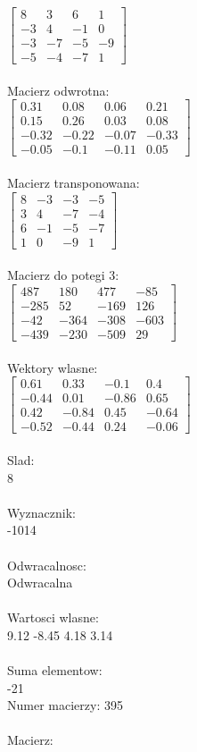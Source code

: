 \documentclass[a4paper,12pt]{article}
\begin{document}
$\begin{bmatrix} 8&3&6&1\\-3&4&-1&0\\-3&-7&-5&-9\\-5&-4&-7&1 \end{bmatrix}$
\\
\\
Macierz odwrotna:\\

$\begin{bmatrix} 0.31&0.08&0.06&0.21\\0.15&0.26&0.03&0.08\\-0.32&-0.22&-0.07&-0.33\\-0.05&-0.1&-0.11&0.05 \end{bmatrix}$
\\
\\
Macierz transponowana:\\

$\begin{bmatrix} 8&-3&-3&-5\\3&4&-7&-4\\6&-1&-5&-7\\1&0&-9&1 \end{bmatrix}$
\\
\\
Macierz do potegi 3:\\

$\begin{bmatrix} 487&180&477&-85\\-285&52&-169&126\\-42&-364&-308&-603\\-439&-230&-509&29 \end{bmatrix}$
\\
\\
Wektory wlasne:\\

$\begin{bmatrix} 0.61&0.33&-0.1&0.4\\-0.44&0.01&-0.86&0.65\\0.42&-0.84&0.45&-0.64\\-0.52&-0.44&0.24&-0.06 \end{bmatrix}$
\\
\\
Slad:\\
8
\\
\\
Wyznacznik:\\
-1014
\\
\\
Odwracalnosc:\\
Odwracalna
\\
\\
Wartosci wlasne:\\
9.12 -8.45 4.18 3.14
\\
\\
Suma elementow:\\
-21
\\
\newpage
Numer macierzy:
395
\\
\\
Macierz:\\
\end{document}
